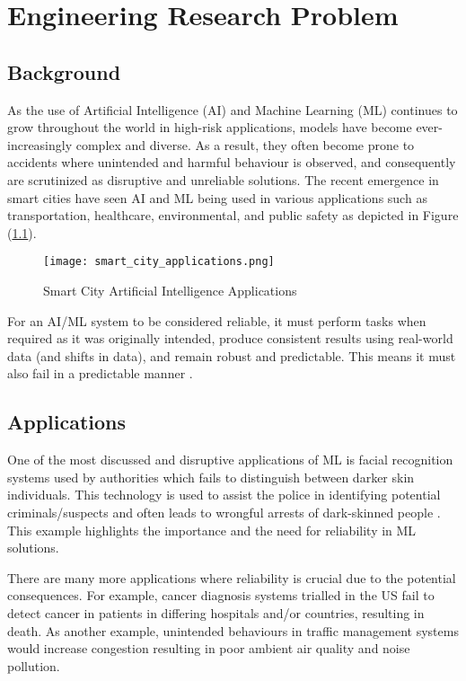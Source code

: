 \chapter{Engineering Research Problem}
\setcounter{page}{1}
\label{chap:chap1}

\section{Background }
As the use of Artificial Intelligence (AI) and Machine 
Learning (ML) continues to grow throughout the world 
in high-risk applications, models have become 
ever-increasingly complex and diverse. As a result, 
they often become prone to accidents where unintended 
and harmful behaviour is observed, and consequently are 
scrutinized as disruptive and unreliable solutions. The 
recent emergence in smart cities have seen AI and ML being 
used in various applications such as transportation, 
healthcare, environmental, and public safety as depicted in Figure (\ref{fig:smart}).

\begin{figure}[h]
    \texttt{[image: smart\_city\_applications.png]}
    \caption{Smart City Artificial Intelligence Applications \cite{chen}}
    \label{fig:smart}
\end{figure}

\enlargethispage{2\baselineskip}
For an AI/ML system to be considered reliable, it must 
perform tasks when required as it was originally 
intended, produce consistent results using real-world 
data (and shifts in data), and remain robust and 
predictable. This means it must also fail in a 
predictable manner \cite{Saif}. 

\section{Applications}
One of the most discussed and disruptive applications of ML is facial 
recognition systems used by authorities which fails to distinguish 
between darker skin individuals. This technology is used to assist the 
police in identifying potential criminals/suspects and often leads to 
wrongful arrests of dark-skinned people \cite{Moutafis}. This example highlights the 
importance and the need for reliability in ML solutions. 

There are many more applications where reliability is crucial due to the 
potential consequences. For example, cancer diagnosis systems trialled in the US fail to detect 
cancer in patients in differing hospitals and/or countries, resulting in death.
 As another example, unintended behaviours in traffic management systems would 
increase congestion resulting in poor ambient air quality and noise 
pollution.

